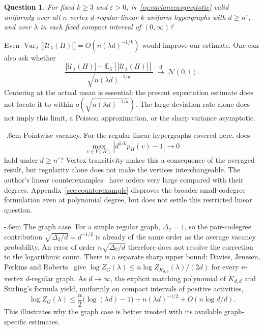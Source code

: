 \documentclass[11pt,reqno]{amsart}
\makeatletter
\numberwithin{equation}{section}
\renewcommand{\paragraph}{\@startsection{paragraph}{4}%
    \z@{.75\linespacing\@plus.2\linespacing\@minus.1\linespacing}%
    {-.6em}%
    {\normalfont\bfseries}}
\theoremstyle{plain}
\newtheorem{question}[theorem]{Question}
\theoremstyle{definition}
\newcommand{\E}{\mathbb E}
\newcommand{\Var}{\operatorname{Var}}
\newcommand{\eps}{\varepsilon}
\newcommand{\calU}{\mathcal U}
\makeatother
\begin{document}
\begin{question}\label{ques:variance}
    For fixed $k\ge3$ and $\eps>0$, is~\eqref{eq:varianceasymptotic} valid uniformly over all $n$-vertex $d$-regular linear $k$-uniform hypergraphs with $d\ge n^\eps$, and over $\lambda$ in each fixed compact interval of $(0,\infty)$?
\end{question}

Even $\Var_\lambda\bigl[|\calU_\lambda(H)|\bigr]=O(n(\lambda d)^{-1/k})$ would improve our estimate.
One can also ask whether
\[
    \frac{|\calU_\lambda(H)|-\E_\lambda[|\calU_\lambda(H)|]}{\sqrt{n(\lambda d)^{-1/k}}}
    \ \xrightarrow{\mathrm d}\ \mathcal N(0,1).
\]
Centering at the actual mean is essential: the present expectation estimate does not locate it to within $o(\sqrt{n(\lambda d)^{-1/k}})$.
The large-deviation rate alone does not imply this limit, a Poisson approximation, or the sharp variance asymptotic.

\paragraph{Pointwise vacancy.}
For the regular linear hypergraphs covered here, does
\[
    \max_{v\in V(H)}|d^{1/k}p_H(v)-1| \longrightarrow 0
\]
hold under $d\ge n^\eps$?
Vertex transitivity makes this a consequence of the averaged result, but regularity alone does not make the vertices interchangeable.
The author's linear counterexamples~\cite{Lee} have orders very large compared with their degrees.
Appendix~\ref{sec:counterexample} disproves the broader small-codegree formulation even at polynomial degree, but does not settle this restricted linear question.

\paragraph{The graph case.}
For a simple regular graph, $\Delta_2=1$, so the pair-codegree contribution $\sqrt{\Delta_2/d}=d^{-1/2}$ is already of the same order as the average vacancy probability.
An error of order $n\sqrt{\Delta_2/d}$ therefore does not resolve the correction to the logarithmic count.
There is a separate sharp upper bound: Davies, Jenssen, Perkins and Roberts~\cite{DJPR} give $\log Z_G(\lambda)\le n\log Z_{K_{d,d}}(\lambda)/(2d)$ for every $n$-vertex $d$-regular graph.
As $d\to\infty$, the explicit matching polynomial of $K_{d,d}$ and Stirling's formula yield, uniformly on compact intervals of positive activities,
\[
    \log Z_G(\lambda)\le\frac n2\bigl(\log(\lambda d)-1\bigr)
    +n(\lambda d)^{-1/2}+O(n\log d/d).
\]
This illustrates why the graph case is better treated with its available graph-specific estimates.
\end{document}
